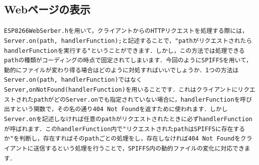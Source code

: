 \subsection{Webページの表示}
\tt{ESP8266WebSerber.h}\rm{}を用いて，クライアントからのHTTPリクエストを処理する際には，\tt{Server.on(path, handlerFunction);}\rm{}と記述することで，"\tt{path}\rm{}がリクエストされたら\tt{handlerFunction}\rm{}を実行する"ということができます．しかし，この方法では処理できる\tt{path}\rm{}の種類がコーディングの時点で固定されてしまいます．今回のようにSPIFFSを用いて，動的にファイルが変わり得る場合はどのように対処すればいいでしょうか．1つの方法は\tt{Server.on(path, handlerFunction)}\rm{}ではなく\tt{Server,onNotFound(handlerFunction)}\rm{}を用いることです．これはクライアントにリクエストされた\tt{path}\rm{}がどの\tt{Server.on}\rm{}でも指定されていない場合に，\tt{handlerFunction}\rm{}を呼び出すという関数で，その名の通り404 Not Foundを返すために使われます．しかし\tt{Server.on}\rm{}を記述しなければ任意の\tt{path}\rm{}がリクエストされたときに必ず\tt{handlerFunction}\rm{}が呼ばれます．この\tt{handlerFunction}\rm{}内で"リクエストされた\tt{path}\rm{}はSPIFFSに存在するか"を判断し，存在すればその\tt{path}\rm{}ごとの処理をし，存在しなければ404 Not Foundをクライアントに送信するという処理を行うことで，SPIFFS内の動的ファイルの変化に対応できます．

